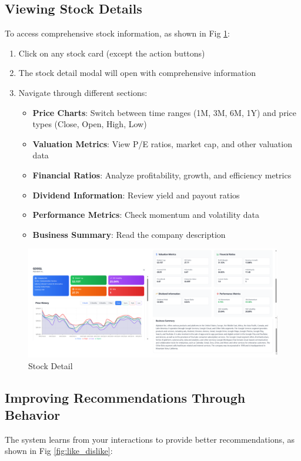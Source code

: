 \subsection{Viewing Stock Details}
To access comprehensive stock information, as shown in Fig \ref{fig:stock_detail}:

\begin{enumerate}
    \item Click on any stock card (except the action buttons)
    \item The stock detail modal will open with comprehensive information
    \item Navigate through different sections:
    \begin{itemize}
        \item \textbf{Price Charts}: Switch between time ranges (1M, 3M, 6M, 1Y) and price types (Close, Open, High, Low)
        \item \textbf{Valuation Metrics}: View P/E ratios, market cap, and other valuation data
        \item \textbf{Financial Ratios}: Analyze profitability, growth, and efficiency metrics
        \item \textbf{Dividend Information}: Review yield and payout ratios
        \item \textbf{Performance Metrics}: Check momentum and volatility data
        \item \textbf{Business Summary}: Read the company description
    \end{itemize}
\end{enumerate}

\begin{figure}[H]
    \centering
    \includegraphics[width=1\linewidth]{images/stock_recommend/user_guide/stock_detail.png}
    \caption{Stock Detail}
    \label{fig:stock_detail}
\end{figure}

\subsection{Improving Recommendations Through Behavior}
The system learns from your interactions to provide better recommendations, as shown in Fig \ref{fig:like_dislike}:

